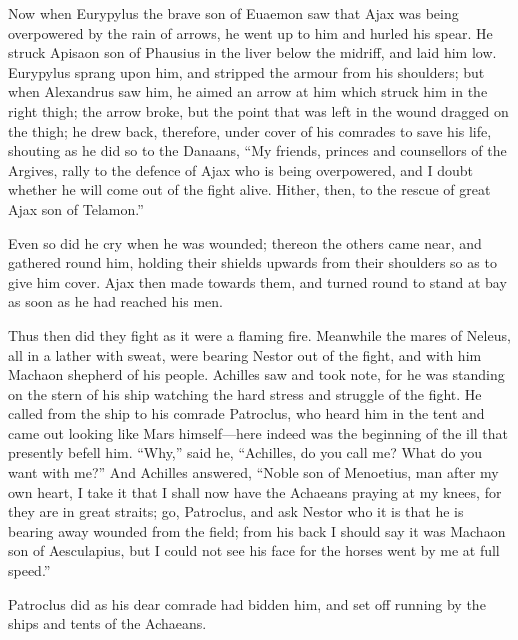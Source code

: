 Now when Eurypylus the brave son of Euaemon saw that Ajax was being
overpowered by the rain of arrows, he went up to him and hurled his spear.
He struck Apisaon son of Phausius in the liver below the midriff, and laid
him low. Eurypylus sprang upon him, and stripped the armour from his
shoulders; but when Alexandrus saw him, he aimed an arrow at him which
struck him in the right thigh; the arrow broke, but the point that was
left in the wound dragged on the thigh; he drew back, therefore, under
cover of his comrades to save his life, shouting as he did so to the
Danaans, “My friends, princes and counsellors of the Argives, rally to the
defence of Ajax who is being overpowered, and I doubt whether he will come
out of the fight alive. Hither, then, to the rescue of great Ajax son of
Telamon.”

Even so did he cry when he was wounded; thereon the others came near, and
gathered round him, holding their shields upwards from their shoulders so
as to give him cover. Ajax then made towards them, and turned round to
stand at bay as soon as he had reached his men.

Thus then did they fight as it were a flaming fire. Meanwhile the mares of
Neleus, all in a lather with sweat, were bearing Nestor out of the fight,
and with him Machaon shepherd of his people. Achilles saw and took note,
for he was standing on the stern of his ship watching the hard stress and
struggle of the fight. He called from the ship to his comrade Patroclus,
who heard him in the tent and came out looking like Mars himself—here
indeed was the beginning of the ill that presently befell him. “Why,” said
he, “Achilles, do you call me? What do you want with me?” And Achilles
answered, “Noble son of Menoetius, man after my own heart, I take it that
I shall now have the Achaeans praying at my knees, for they are in great
straits; go, Patroclus, and ask Nestor who it is that he is bearing away
wounded from the field; from his back I should say it was Machaon son of
Aesculapius, but I could not see his face for the horses went by me at
full speed.”

Patroclus did as his dear comrade had bidden him, and set off running by
the ships and tents of the Achaeans.

